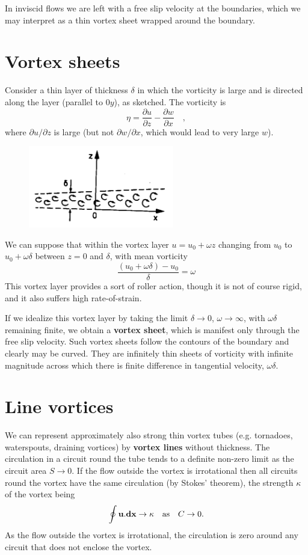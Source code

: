 \documentclass[twoside,a4paper,11pt]{report}
\begin{document}
In inviscid flows we are left with a free slip velocity at the boundaries, 
which we may interpret as a thin vortex sheet wrapped around the boundary.

\section{Vortex sheets}
Consider a thin layer of thickness $\delta $ in which the vorticity is large 
and is directed along the layer (parallel to $0y$), as sketched. The vorticity 
is
\[
\eta =\frac{\partial u}{\partial z}-\frac{\partial w}{\partial x}\quad ,
\]
where $\partial u/\partial z$ is large (but not $\partial w/\partial x$, 
which would lead to very large $w$).

\begin{figure}
\centerline{\includegraphics[width=2.5in]{Section47.pdf}}
\label{fig7}
\end{figure}

We can suppose that within the vortex layer $u = u_{0}+\omega z$ changing 
from $u_{0}$ to $u_{0}+\omega \delta $ between $ z = 0$ and $\delta $, 
with mean vorticity
\[
\frac{\left( {u_0 +\omega \delta } \right)-u_0 }{\delta }=\omega 
\]
This vortex layer provides a sort of roller action, though it is not of 
course rigid, and it also suffers high rate-of-strain.

If we idealize this vortex layer by taking the limit $\delta \to  0$, 
$\omega  \to \infty $, with $\omega \delta $ remaining finite, we 
obtain a \textbf{vortex sheet}, which is manifest only through the free slip 
velocity. Such vortex sheets follow the contours of the boundary and clearly 
may be curved. They are infinitely thin sheets of vorticity with infinite 
magnitude across which there is finite difference in tangential velocity, 
$\omega \delta $.

\section{Line vortices}
We can represent approximately also strong thin vortex tubes (e.g. 
tornadoes, waterspouts, draining vortices) by \textbf{vortex lines} without 
thickness. The circulation in a circuit round the tube tends to a definite 
non-zero limit as the circuit area $S \to 0$. If the flow outside the 
vortex is irrotational then all circuits round the vortex have the same 
circulation (by Stokes' theorem), the strength $\kappa $ of the vortex being
\[\oint {{{\bf u}}. {{\bf dx}}} \to \kappa \quad\hbox{as}\quad C \to  0 . \]
As the flow outside the vortex is irrotational, the circulation is zero 
around any circuit that does not enclose the vortex.
\end{document}
